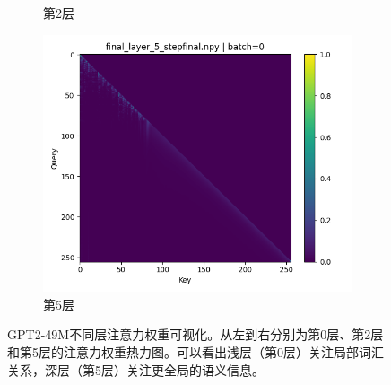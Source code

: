 \documentclass{article}
\begin{document}
\begin{figure}[H]
\begin{subfigure}[b]{0.3\textwidth}
\caption{第2层}
\label{fig:attn_49m_l2_b0}
\end{subfigure}
\hfill
\begin{subfigure}[b]{0.3\textwidth}
\includegraphics[width=\textwidth]{../visualize/attentions/GPT2-49M/final_layer_5_stepfinal_b0.png}
\caption{第5层}
\label{fig:attn_49m_l5_b0}
\end{subfigure}
\caption{GPT2-49M不同层注意力权重可视化。从左到右分别为第0层、第2层和第5层的注意力权重热力图。可以看出浅层（第0层）关注局部词汇关系，深层（第5层）关注更全局的语义信息。}
\label{fig:attn_49m_comparison}
\end{figure}

\vspace{0.5cm}
\end{document}
